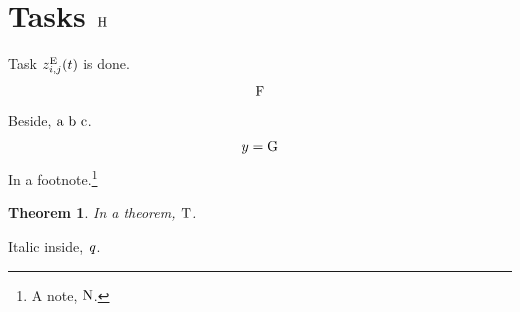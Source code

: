 \documentclass{article}
\newtheorem{theorem}{Theorem}
\begin{document}
\section{Tasks $\text{\text{H}}$}
Task $z_{i,j}^{\text{\text{E}}}(t)$ is done.
\[ \text{\text{\text{F}}} \]
Beside, $\text{a \text{b} c}$.
\begin{equation}
y = \text{\text{G}}
\end{equation}
In a footnote.\footnote{A note, $\text{\text{N}}$.}
\begin{theorem}
In a theorem, $\text{\text{T}}$.
\end{theorem}
Italic inside, $\text{\textit{q}}$.
\end{document}
